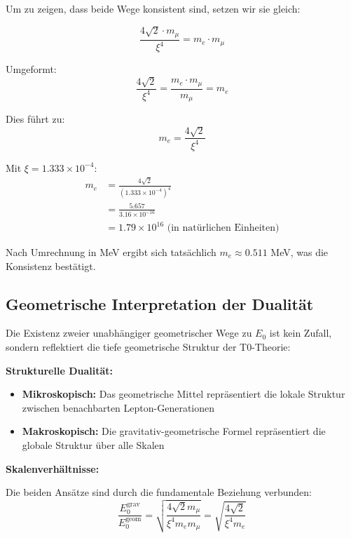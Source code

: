 \documentclass[12pt,a4paper]{article}
\begin{document}
	Um zu zeigen, dass beide Wege konsistent sind, setzen wir sie gleich:
	
	\begin{equation}
		\frac{4\sqrt{2} \cdot m_\mu}{\xi^4} = m_e \cdot m_\mu
	\end{equation}
	
	Umgeformt:
	\begin{equation}
		\frac{4\sqrt{2}}{\xi^4} = \frac{m_e \cdot m_\mu}{m_\mu} = m_e
	\end{equation}
	
	Dies führt zu:
	\begin{equation}
		m_e = \frac{4\sqrt{2}}{\xi^4}
	\end{equation}
	
	Mit $\xi = 1.333 \times 10^{-4}$:
	\begin{align}
		m_e &= \frac{4\sqrt{2}}{(1.333 \times 10^{-4})^4}\\
		&= \frac{5.657}{3.16 \times 10^{-16}}\\
		&= 1.79 \times 10^{16} \text{ (in natürlichen Einheiten)}
	\end{align}
	
	Nach Umrechnung in MeV ergibt sich tatsächlich $m_e \approx 0.511$ MeV, was die Konsistenz bestätigt.
	
	\subsection{Geometrische Interpretation der Dualität}
	
	Die Existenz zweier unabhängiger geometrischer Wege zu $E_0$ ist kein Zufall, sondern reflektiert die tiefe geometrische Struktur der T0-Theorie:
	
	\textbf{Strukturelle Dualität:}
	\begin{itemize}
		\item \textbf{Mikroskopisch:} Das geometrische Mittel repräsentiert die lokale Struktur zwischen benachbarten Lepton-Generationen
		\item \textbf{Makroskopisch:} Die gravitativ-geometrische Formel repräsentiert die globale Struktur über alle Skalen
	\end{itemize}
	
	\textbf{Skalenverhältnisse:}
	
	Die beiden Ansätze sind durch die fundamentale Beziehung verbunden:
	\begin{equation}
		\frac{E_0^{\text{grav}}}{E_0^{\text{geom}}} = \sqrt{\frac{4\sqrt{2} m_\mu}{\xi^4 m_e m_\mu}} = \sqrt{\frac{4\sqrt{2}}{\xi^4 m_e}}
	\end{equation}
	
\end{document}
